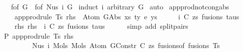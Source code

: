 \begin{isabellebody}
\ \ \ {\isachardoublequoteopen}f{\isacharunderscore}{\kern0pt}of\ G\ {\isasymsubseteq}{\isacharhash}{\kern0pt}\ f{\isacharunderscore}{\kern0pt}of\ {\isacharparenleft}{\kern0pt}Nus{}\ i\ G{\isacharparenright}{\kern0pt}{\isachardoublequoteclose}\isanewline
%
\isadelimproof
%
\endisadelimproof
%
\isatagproof
{}\isamarkupfalse%
\ {\isacharparenleft}{\kern0pt}induct\ i\ arbitrary{\isacharcolon}{\kern0pt}\ G{\isacharparenright}{\kern0pt}\isanewline
{}\isamarkupfalse%
\ auto%
\endisatagproof
{\isafoldproof}%
%
\isadelimproof
\isanewline
%
\endisadelimproof
\isanewline
\isanewline
\isanewline
{}\isamarkupfalse%
\ app{\isacharunderscore}{\kern0pt}prod{\isacharunderscore}{\kern0pt}not{\isacharunderscore}{\kern0pt}cong{\isacharunderscore}{\kern0pt}abs{\isacharcolon}{\kern0pt}\isanewline
\ \ \ {\isachardoublequoteopen}{\isasymnot}\ app{\isacharunderscore}{\kern0pt}prodrule\ Ts\ rhs\ {\isasymsimeq}\ Atom\ {\isacharparenleft}{\kern0pt}GAbs\ xs\ ty{}\ e{\isacharparenright}{\kern0pt}\ ys{\isachardoublequoteclose}\isanewline
%
\isadelimproof
%
\endisadelimproof
%
\isatagproof
{}\isamarkupfalse%
\ {\isacharminus}{\kern0pt}\isanewline
\ \ \isamarkupfalse%
\ i\ C\ zs\ fusions\ taus\ \isanewline
\ \ \ \ rhs{\isacharcolon}{\kern0pt}\ {\isachardoublequoteopen}rhs\ {\isacharequal}{\kern0pt}\ {\isacharparenleft}{\kern0pt}i{\isacharcomma}{\kern0pt}\ {\isacharparenleft}{\kern0pt}C{\isacharcomma}{\kern0pt}\ zs{\isacharparenright}{\kern0pt}{\isacharcomma}{\kern0pt}\ fusions{\isacharcomma}{\kern0pt}\ taus{\isacharparenright}{\kern0pt}{\isachardoublequoteclose}\isanewline
\ \ \ \ \isamarkupfalse%
\ {\isacharparenleft}{\kern0pt}simp\ add{\isacharcolon}{\kern0pt}\ split{\isacharunderscore}{\kern0pt}pairs{}{\isacharparenright}{\kern0pt}\isanewline
\ \ \isamarkupfalse%
\ \isamarkupfalse%
\ P{}{\isacharcolon}{\kern0pt}\ {\isachardoublequoteopen}app{\isacharunderscore}{\kern0pt}prodrule\ Ts\ rhs\ {\isacharequal}{\kern0pt}\isanewline
\ \ \ \ \ \ \ \ \ Nus{}\ i\ {\isacharparenleft}{\kern0pt}Mols{}\ {\isacharparenleft}{\kern0pt}Mols{}\ {\isacharparenleft}{\kern0pt}Atom\ {\isacharparenleft}{\kern0pt}GConstr\ C{\isacharparenright}{\kern0pt}\ zs{\isacharparenright}{\kern0pt}\ {\isacharparenleft}{\kern0pt}fusions{\isacharunderscore}{\kern0pt}of\ fusions{\isacharparenright}{\kern0pt}{\isacharparenright}{\kern0pt}\ Ts{\isacharparenright}{\kern0pt}{\isachardoublequoteclose}\isanewline

\end{isabellebody}
